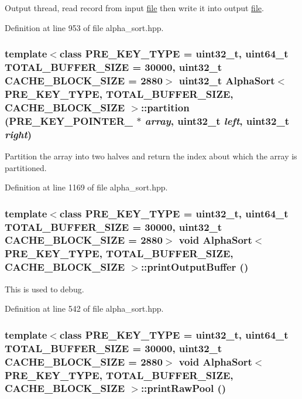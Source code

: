 Output thread, read record from input \hyperlink{classfile}{file} then write it into output \hyperlink{classfile}{file}. 

Definition at line 953 of file alpha\_\-sort.hpp.\hypertarget{classAlphaSort_b309f1fae2d6f364d967b7e21358417c}{
\subsubsection[{partition}]{\setlength{\rightskip}{0pt plus 5cm}template$<$class PRE\_\-KEY\_\-TYPE  = uint32\_\-t, uint64\_\-t TOTAL\_\-BUFFER\_\-SIZE = 30000, uint32\_\-t CACHE\_\-BLOCK\_\-SIZE = 2880$>$ uint32\_\-t {\bf AlphaSort}$<$ PRE\_\-KEY\_\-TYPE, TOTAL\_\-BUFFER\_\-SIZE, CACHE\_\-BLOCK\_\-SIZE $>$::partition (PRE\_\-KEY\_\-POINTER\_\- $\ast$ {\em array}, \/  uint32\_\-t {\em left}, \/  uint32\_\-t {\em right})}}
\label{classAlphaSort_b309f1fae2d6f364d967b7e21358417c}


Partition the array into two halves and return the index about which the array is partitioned. 

Definition at line 1169 of file alpha\_\-sort.hpp.\hypertarget{classAlphaSort_64e2cf8ecfa1f8b2fcd19430bda724ad}{
\subsubsection[{printOutputBuffer}]{\setlength{\rightskip}{0pt plus 5cm}template$<$class PRE\_\-KEY\_\-TYPE  = uint32\_\-t, uint64\_\-t TOTAL\_\-BUFFER\_\-SIZE = 30000, uint32\_\-t CACHE\_\-BLOCK\_\-SIZE = 2880$>$ void {\bf AlphaSort}$<$ PRE\_\-KEY\_\-TYPE, TOTAL\_\-BUFFER\_\-SIZE, CACHE\_\-BLOCK\_\-SIZE $>$::printOutputBuffer ()}}
\label{classAlphaSort_64e2cf8ecfa1f8b2fcd19430bda724ad}


This is used to debug. 

Definition at line 542 of file alpha\_\-sort.hpp.\hypertarget{classAlphaSort_70177f91c6fce0f8d8c7f832626c72a3}{
\subsubsection[{printRawPool}]{\setlength{\rightskip}{0pt plus 5cm}template$<$class PRE\_\-KEY\_\-TYPE  = uint32\_\-t, uint64\_\-t TOTAL\_\-BUFFER\_\-SIZE = 30000, uint32\_\-t CACHE\_\-BLOCK\_\-SIZE = 2880$>$ void {\bf AlphaSort}$<$ PRE\_\-KEY\_\-TYPE, TOTAL\_\-BUFFER\_\-SIZE, CACHE\_\-BLOCK\_\-SIZE $>$::printRawPool ()}}
\label{classAlphaSort_70177f91c6fce0f8d8c7f832626c72a3}


